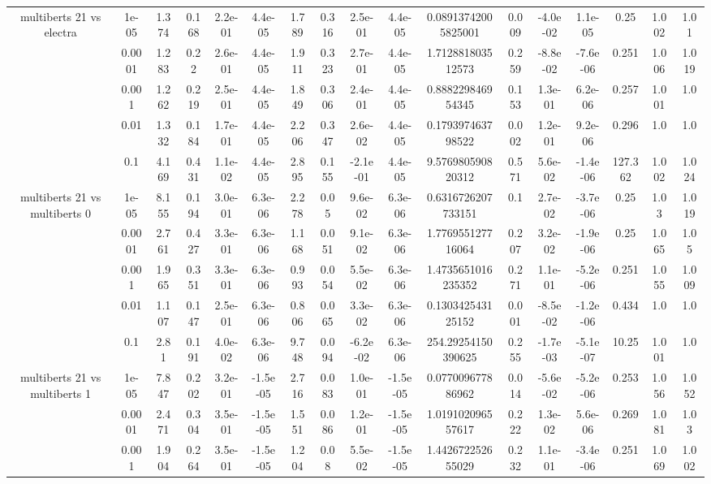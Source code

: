 \begin{tabular}{|c|c|c|c|c|c|c|c|c|c|c|c|c|c|c|c|c|}
\hline
\multirow{5}{*}{multiberts 21 vs electra } & 1e-05 & 1.374 & 0.168 & 2.2e-01 & 4.4e-05 & 1.789 & 0.316 & 2.5e-01 & 4.4e-05 & 0.08913742005825001 & 0.009 & -4.0e-02 & 1.1e-05 & 0.25 & 1.002 & 1.01 \\
 & 0.0001 & 1.283 & 0.22 & 2.6e-01 & 4.4e-05 & 1.911 & 0.323 & 2.7e-01 & 4.4e-05 & 1.712881803512573 & 0.259 & -8.8e-02 & -7.6e-06 & 0.251 & 1.006 & 1.019 \\
 & 0.001 & 1.262 & 0.219 & 2.5e-01 & 4.4e-05 & 1.849 & 0.306 & 2.4e-01 & 4.4e-05 & 0.888229846954345 & 0.153 & 1.3e-01 & 6.2e-06 & 0.257 & 1.001 & 1.0 \\
 & 0.01 & 1.332 & 0.184 & 1.7e-01 & 4.4e-05 & 2.206 & 0.347 & 2.6e-02 & 4.4e-05 & 0.179397463798522 & 0.002 & 1.2e-01 & 9.2e-06 & 0.296 & 1.0 & 1.0 \\
 & 0.1 & 4.169 & 0.431 & 1.1e-02 & 4.4e-05 & 2.895 & 0.155 & -2.1e-01 & 4.4e-05 & 9.576980590820312 & 0.571 & 5.6e-02 & -1.4e-06 & 127.362 & 1.002 & 1.024 \\
\hline
\multirow{5}{*}{multiberts 21 vs multiberts 0} & 1e-05 & 8.155 & 0.194 & 3.0e-01 & 6.3e-06 & 2.278 & 0.05 & 9.6e-02 & 6.3e-06 & 0.6316726207733151 & 0.1 & 2.7e-02 & -3.7e-06 & 0.25 & 1.03 & 1.019 \\
 & 0.0001 & 2.761 & 0.427 & 3.3e-01 & 6.3e-06 & 1.168 & 0.051 & 9.1e-02 & 6.3e-06 & 1.776955127716064 & 0.207 & 3.2e-02 & -1.9e-06 & 0.25 & 1.065 & 1.05 \\
 & 0.001 & 1.965 & 0.351 & 3.3e-01 & 6.3e-06 & 0.993 & 0.054 & 5.5e-02 & 6.3e-06 & 1.4735651016235352 & 0.271 & 1.1e-01 & -5.2e-06 & 0.251 & 1.055 & 1.009 \\
 & 0.01 & 1.107 & 0.147 & 2.5e-01 & 6.3e-06 & 0.806 & 0.065 & 3.3e-02 & 6.3e-06 & 0.130342543125152 & 0.001 & -8.5e-02 & -1.2e-06 & 0.434 & 1.0 & 1.0 \\
 & 0.1 & 2.81 & 0.191 & 4.0e-02 & 6.3e-06 & 9.748 & 0.094 & -6.2e-02 & 6.3e-06 & 254.29254150390625 & 0.255 & -1.7e-03 & -5.1e-07 & 10.25 & 1.001 & 1.0 \\
\hline
\multirow{5}{*}{multiberts 21 vs multiberts 1} & 1e-05 & 7.847 & 0.202 & 3.2e-01 & -1.5e-05 & 2.716 & 0.083 & 1.0e-01 & -1.5e-05 & 0.077009677886962 & 0.014 & -5.6e-02 & -5.2e-06 & 0.253 & 1.056 & 1.052 \\
 & 0.0001 & 2.471 & 0.304 & 3.5e-01 & -1.5e-05 & 1.551 & 0.086 & 1.2e-01 & -1.5e-05 & 1.019102096557617 & 0.222 & 1.3e-02 & 5.6e-06 & 0.269 & 1.081 & 1.03 \\
 & 0.001 & 1.904 & 0.264 & 3.5e-01 & -1.5e-05 & 1.204 & 0.08 & 5.5e-02 & -1.5e-05 & 1.442672252655029 & 0.232 & 1.1e-01 & -3.4e-06 & 0.251 & 1.069 & 1.002 \\

\end{tabular}
